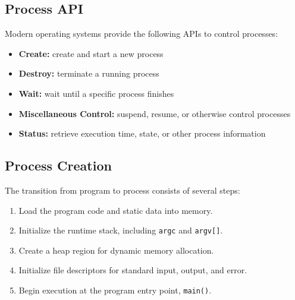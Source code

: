 \subsection{Process API}
Modern operating systems provide the following APIs to control processes:
\begin{itemize}
    \item \textbf{Create:} create and start a new process
    \item \textbf{Destroy:} terminate a running process
    \item \textbf{Wait:} wait until a specific process finishes
    \item \textbf{Miscellaneous Control:} suspend, resume, or otherwise control processes
    \item \textbf{Status:} retrieve execution time, state, or other process information
\end{itemize}

\subsection{Process Creation}
The transition from program to process consists of several steps:
\begin{enumerate}
    \item Load the program code and static data into memory.
    \item Initialize the runtime stack, including \texttt{argc} and \texttt{argv[]}.
    \item Create a heap region for dynamic memory allocation.
    \item Initialize file descriptors for standard input, output, and error.
    \item Begin execution at the program entry point, \texttt{main()}.
\end{enumerate}